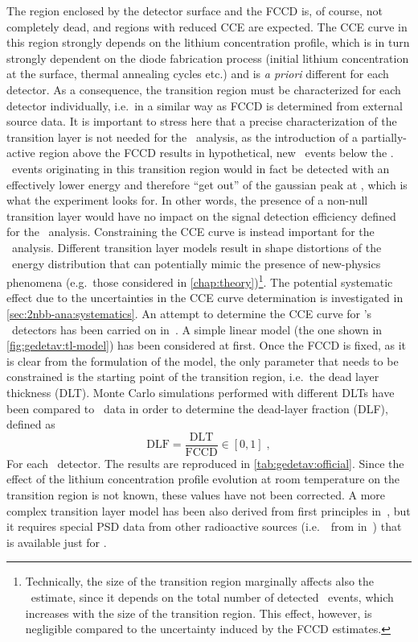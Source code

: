 The region enclosed by the detector surface and the FCCD is, of course, not completely
dead, and regions with reduced CCE are expected. The CCE curve in this region strongly
depends on the lithium concentration profile, which is in turn strongly dependent on the
diode fabrication process (initial lithium concentration at the surface, thermal annealing
cycles etc.) and is \emph{a priori} different for each detector. As a consequence, the
transition region must be characterized for each detector individually, i.e.~in a similar
way as FCCD is determined from external source data.
\newpar
It is important to stress here that a precise characterization of the transition layer is
not needed for the \onbb\ analysis, as the introduction of a partially-active region above
the FCCD results in hypothetical, new \onbb\ events below the \qbb. \onbb\ events
originating in this transition region would in fact be detected with an effectively lower
energy and therefore ``get out'' of the gaussian peak at \qbb, which is what the experiment
looks for. In other words, the presence of a non-null transition layer would have no
impact on the signal detection efficiency defined for the \onbb\ analysis. Constraining
the CCE curve is instead important for the \nnbb\ analysis. Different transition layer
models result in shape distortions of the \nnbb\ energy distribution that can potentially
mimic the presence of new-physics phenomena (e.g.~those considered in
\cref{chap:theory})\footnote{%
  Technically, the size of the transition region marginally affects also the \thalftwo\
  estimate, since it depends on the total number of detected \nnbb\ events, which
  increases with the size of the transition region. This effect, however, is negligible
  compared to the uncertainty induced by the FCCD estimates.
}. The potential systematic effect due to the uncertainties in the CCE curve determination
is investigated in \cref{sec:2nbb-ana:systematics}.
\newpar
An attempt to determine the CCE curve for \gerda's \bege\ detectors has been carried on
in~\cite{Lehnert2016}. A simple linear model (the one shown in
\cref{fig:gedetav:tl-model}) has been considered at first. Once the FCCD is fixed, as it
is clear from the formulation of the model, the only parameter that needs to be
constrained is the starting point of the transition region, i.e.~the dead layer thickness
(DLT). Monte Carlo simulations performed with different DLTs have been compared to \Am\
data in order to determine the dead-layer fraction (DLF), defined as
\[
  \text{DLF} = \frac{\text{DLT}}{\text{FCCD}} \in [0,1] \;,
\]
For each \bege\ detector. The results are reproduced in \cref{tab:gedetav:official}. Since
the effect of the lithium concentration profile evolution at room temperature on the
transition region is not known, these values have not been corrected. A more complex
transition layer model has been also derived from first principles in~\cite{Lehnert2016},
but it requires special PSD data from other radioactive sources (i.e.~\aoe\ from
\nuc{Sr}{90} in~\cite{Lehnert2016}) that is available just for \GD{91C}.

